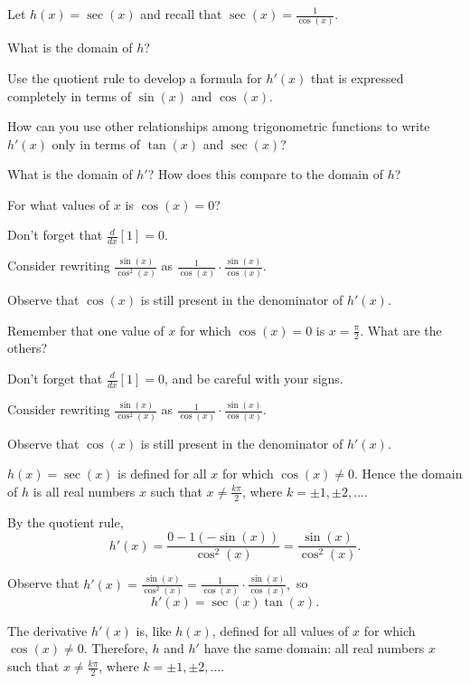 \begin{activity} \label{A:2.4.1}  
Let $h(x) = \sec(x)$ and recall that $\sec(x) = \frac{1}{\cos(x)}$.
\ba
	\item What is the domain of $h$?
	\item Use the quotient rule to develop a formula for $h'(x)$ that is expressed completely in terms of $\sin(x)$ and $\cos(x)$.
	\item How can you use other relationships among trigonometric functions to write $h'(x)$ only in terms of $\tan(x)$ and $\sec(x)$?
	\item What is the domain of $h'$?  How does this compare to the domain of $h$? 
\ea
\end{activity}
\begin{smallhint}
\ba
	\item For what values of $x$ is $\cos(x) = 0$?
	\item Don't forget that $\frac{d}{dx}[1] = 0$.
	\item Consider rewriting $\frac{\sin(x)}{\cos^2(x)}$ as $\frac{1}{\cos(x)} \cdot \frac{\sin(x)}{\cos(x)}$.
	\item Observe that $\cos(x)$ is still present in the denominator of $h'(x)$. 
\ea
\end{smallhint}
\begin{bighint}
\ba
	\item Remember that one value of $x$ for which $\cos(x) = 0$ is $x = \frac{\pi}{2}$.  What are the others?
	\item Don't forget that $\frac{d}{dx}[1] = 0$, and be careful with your signs.
	\item Consider rewriting $\frac{\sin(x)}{\cos^2(x)}$ as $\frac{1}{\cos(x)} \cdot \frac{\sin(x)}{\cos(x)}$.
	\item Observe that $\cos(x)$ is still present in the denominator of $h'(x)$. 
\ea
\end{bighint}
\begin{activitySolution}
\ba
	\item $h(x) = \sec(x)$ is defined for all $x$ for which $\cos(x) \ne 0$.  Hence the domain of $h$ is all real numbers $x$ such that $x \ne \frac{k\pi}{2}$, where $k = \pm 1, \pm 2, \ldots$.
	\item By the quotient rule,
	$$h'(x) = \frac{0 - 1  (-\sin(x))}{\cos^2(x)} = \frac{\sin(x)}{\cos^2(x)}.$$
	\item Observe that $h'(x) = \frac{\sin(x)}{\cos^2(x)} = \frac{1}{\cos(x)} \cdot \frac{\sin(x)}{\cos(x)},$ so
	$$h'(x) = \sec(x) \tan(x).$$
	\item The derivative $h'(x)$ is, like $h(x)$, defined for all values of $x$ for which $\cos(x) \ne 0$.  Therefore, $h$ and $h'$ have the same domain:  all real numbers $x$ such that $x \ne \frac{k\pi}{2}$, where $k = \pm 1, \pm 2, \ldots$.
\ea
\end{activitySolution}
\aftera